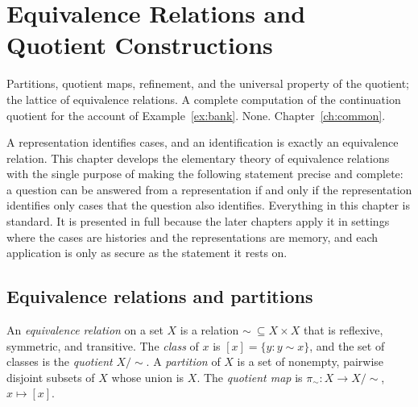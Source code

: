 \chapter{Equivalence Relations and Quotient Constructions}\label{ch:quotients}
{Partitions, quotient maps, refinement, and the universal property of the quotient; the lattice of equivalence relations.}
{A complete computation of the continuation quotient for the account of Example~\ref{ex:bank}.}
{None.}
{Chapter~\ref{ch:common}.}

A representation identifies cases, and an identification is exactly an equivalence relation. This chapter develops the elementary theory of equivalence relations with the single purpose of making the following statement precise and complete: a question can be answered from a representation if and only if the representation identifies only cases that the question also identifies. Everything in this chapter is standard. It is presented in full because the later chapters apply it in settings where the cases are histories and the representations are memory, and each application is only as secure as the statement it rests on.

\section{Equivalence relations and partitions}

\begin{definition}
An \emph{equivalence relation} on a set $X$ is a relation $\sim\ \subseteq X\times X$ that is reflexive, symmetric, and transitive. The \emph{class} of $x$ is $[x]=\{y : y\sim x\}$, and the set of classes is the \emph{quotient} $X/{\sim}$. A \emph{partition} of $X$ is a set of nonempty, pairwise disjoint subsets of $X$ whose union is $X$. The \emph{quotient map} is $\pi_{\sim}:X\to X/{\sim}$, $x\mapsto[x]$.
\end{definition}

